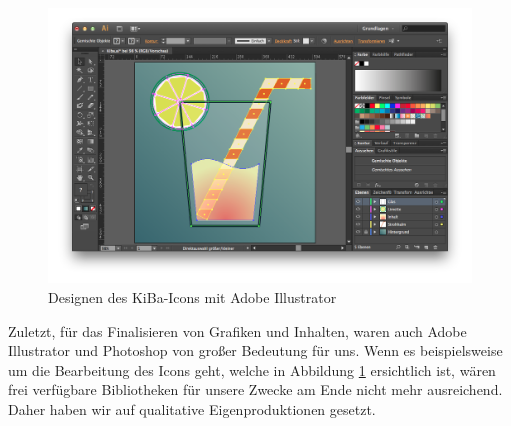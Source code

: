 \begin{figure}[ht!]
	\centering
	\includegraphics[scale=.3]{Pictures/IllustratorIcon}
	\vspace{-.8cm}
	\caption{Designen des KiBa-Icons mit Adobe Illustrator\label{fig:IllustratorIcon}}
\end{figure}

	Zuletzt, für das Finalisieren von Grafiken und Inhalten, waren auch Adobe Illustrator und Photoshop von großer Bedeutung für uns. Wenn es beispielsweise um die Bearbeitung des Icons geht, welche in Abbildung \ref{fig:IllustratorIcon} ersichtlich ist, wären frei verfügbare Bibliotheken für unsere Zwecke am Ende nicht mehr ausreichend. Daher haben wir auf qualitative Eigenproduktionen gesetzt.
